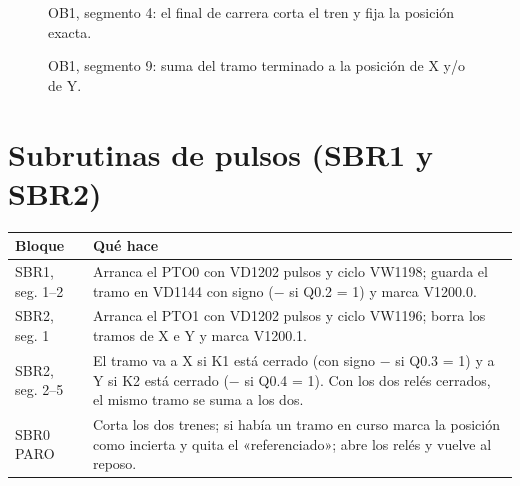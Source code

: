\begin{figure}[H]
\centering
{}
\caption{OB1, segmento 4: el final de carrera corta el tren y fija la posición exacta.}
\end{figure}

\begin{figure}[H]
\centering
{}
\caption{OB1, segmento 9: suma del tramo terminado a la posición de X y/o de Y.}
\end{figure}

\section{Subrutinas de pulsos (SBR1 y SBR2)}
\begin{center}\small
\begin{longtable}{>{\raggedright}p{2.2cm} >{\raggedright\arraybackslash}p{12.8cm}}
\toprule
\textbf{Bloque} & \textbf{Qué hace}\\
\midrule
\endhead
SBR1, seg. 1--2 & Arranca el PTO0 con VD1202 pulsos y ciclo VW1198; guarda el tramo en VD1144 con signo ($-$ si Q0.2 = 1) y marca V1200.0.\\
SBR2, seg. 1 & Arranca el PTO1 con VD1202 pulsos y ciclo VW1196; borra los tramos de X e Y y marca V1200.1.\\
SBR2, seg. 2--5 & El tramo va a X si K1 está cerrado (con signo $-$ si Q0.3 = 1) y a Y si K2 está cerrado ($-$ si Q0.4 = 1). Con los dos relés cerrados, el mismo tramo se suma a los dos.\\
SBR0 PARO & Corta los dos trenes; si había un tramo en curso marca la posición como incierta y quita el «referenciado»; abre los relés y vuelve al reposo.\\
\bottomrule
\end{longtable}
\end{center}

